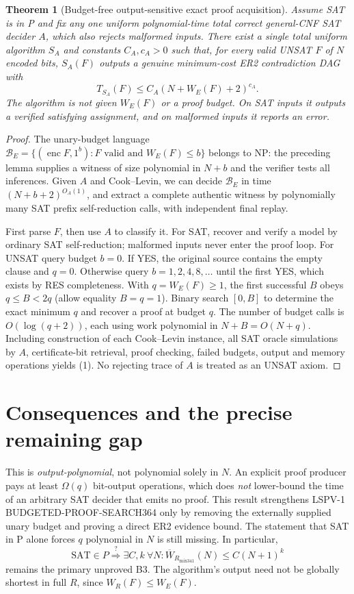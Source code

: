 \documentclass[11pt]{article}
\newtheorem{theorem}{Theorem}
\begin{document}
\begin{theorem}[Budget-free output-sensitive exact proof acquisition]
Assume SAT is in P and fix any one uniform polynomial-time total correct general-CNF SAT decider $A$, which also rejects malformed inputs. There exist a single total uniform algorithm $S_A$ and constants $C_A,c_A>0$ such that, for every valid UNSAT $F$ of $N$ encoded bits, $S_A(F)$ outputs a genuine minimum-cost ER2 contradiction DAG with
\[
T_{S_A}(F)\le C_A(N+W_E(F)+2)^{c_A}.
\tag{1}
\]
The algorithm is not given $W_E(F)$ or a proof budget. On SAT inputs it outputs a verified satisfying assignment, and on malformed inputs it reports an error.
\end{theorem}
\begin{proof}
The unary-budget language $\mathcal B_E=\{(\operatorname{enc}F,1^b): F\text{ valid and }W_E(F)\le b\}$ belongs to NP: the preceding lemma supplies a witness of size polynomial in $N+b$ and the verifier tests all inferences. Given $A$ and Cook--Levin, we can decide $\mathcal B_E$ in time $(N+b+2)^{O_A(1)}$, and extract a complete authentic witness by polynomially many SAT prefix self-reduction calls, with independent final replay.

First parse $F$, then use $A$ to classify it. For SAT, recover and verify a model by ordinary SAT self-reduction; malformed inputs never enter the proof loop. For UNSAT query budget $b=0$. If YES, the original source contains the empty clause and $q=0$. Otherwise query $b=1,2,4,8,\ldots$ until the first YES, which exists by RES completeness. With $q=W_E(F)\ge1$, the first successful $B$ obeys $q\le B<2q$ (allow equality $B=q=1$). Binary search $[0,B]$ to determine the exact minimum $q$ and recover a proof at budget $q$. The number of budget calls is $O(\log(q+2))$, each using work polynomial in $N+B=O(N+q)$. Including construction of each Cook--Levin instance, all SAT oracle simulations by $A$, certificate-bit retrieval, proof checking, failed budgets, output and memory operations yields (1). No rejecting trace of $A$ is treated as an UNSAT axiom.
\end{proof}

\section*{Consequences and the precise remaining gap}
This is \emph{output-polynomial}, not polynomial solely in $N$. An explicit proof producer pays at least $\Omega(q)$ bit-output operations, which does \emph{not} lower-bound the time of an arbitrary SAT decider that emits no proof. This result strengthens LSPV-1 BUDGETED-PROOF-SEARCH364 only by removing the externally supplied unary budget and proving a direct ER2 evidence bound. The statement that SAT in P alone forces $q$ polynomial in $N$ is still missing. In particular,
\[
\mathrm{SAT}\in P\stackrel{?}{\Longrightarrow}\exists C,k\ \forall N:
\overline W_{R_{\mathrm{mix341}}}(N)\le C(N+1)^k
\]
remains the primary unproved B3. The algorithm's output need not be globally shortest in full $R$, since $W_R(F)\le W_E(F)$.
\end{document}
